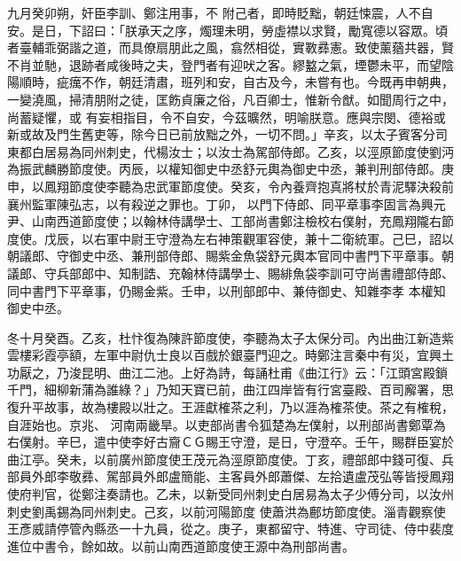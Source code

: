 \begin{pinyinscope}
 九月癸卯朔，奸臣李訓、鄭注用事，不
 附己者，即時貶黜，朝廷悚震，人不自安。是日，下詔曰：「朕承天之序，燭理未明，勞虛襟以求賢，勵寬德以容眾。頃者臺輔乖弼諧之道，而具僚扇朋此之風，翕然相從，實斁彞憲。致使薰蕕共器，賢不肖並馳，退跡者咸後時之夫，登門者有迎吠之客。繆盭之氣，堙鬱未平，而望陰陽順時，疵癘不作，朝廷清肅，班列和安，自古及今，未嘗有也。今既再申朝典，一變澆風，掃清朋附之徒，匡飭貞廉之俗，凡百卿士，惟新令猷。如聞周行之中，尚蓄疑懼，或
 有妄相指目，令不自安，今茲曠然，明喻朕意。應與宗閔、德裕或新或故及門生舊吏等，除今日已前放黜之外，一切不問。」辛亥，以太子賓客分司東都白居易為同州刺史，代楊汝士；以汝士為駕部侍郎。乙亥，以涇原節度使劉沔為振武麟勝節度使。丙辰，以權知御史中丞舒元輿為御史中丞，兼判刑部侍郎。庚申，以鳳翔節度使李聽為忠武軍節度使。癸亥，令內養齊抱真將杖於青泥驛決殺前襄州監軍陳弘志，以有殺逆之罪也。丁卯，
 以門下侍郎、同平章事李固言為興元尹、山南西道節度使；以翰林侍講學士、工部尚書鄭注檢校右僕射，充鳳翔隴右節度使。戊辰，以右軍中尉王守澄為左右神策觀軍容使，兼十二衛統軍。己巳，詔以朝議郎、守御史中丞、兼刑部侍郎、賜紫金魚袋舒元輿本官同中書門下平章事。朝議郎、守兵部郎中、知制誥、充翰林侍講學士、賜緋魚袋李訓可守尚書禮部侍郎、同中書門下平章事，仍賜金紫。壬申，以刑部郎中、兼侍御史、知雜李孝
 本權知御史中丞。



 冬十月癸酉。乙亥，杜忭復為陳許節度使，李聽為太子太保分司。內出曲江新造紫雲樓彩霞亭額，左軍中尉仇士良以百戲於銀臺門迎之。時鄭注言秦中有災，宜興土功厭之，乃浚昆明、曲江二池。上好為詩，每誦杜甫《曲江行》云：「江頭宮殿鎖千門，細柳新蒲為誰綠？」乃知天寶已前，曲江四岸皆有行宮臺殿、百司廨署，思復升平故事，故為樓殿以壯之。王涯獻榷茶之利，乃以涯為榷茶使。茶之有榷稅，自涯始也。京兆、
 河南兩畿旱。以吏部尚書令狐楚為左僕射，以刑部尚書鄭覃為右僕射。辛巳，遣中使李好古齎ＣＧ賜王守澄，是日，守澄卒。壬午，賜群臣宴於曲江亭。癸未，以前廣州節度使王茂元為涇原節度使。丁亥，禮部郎中錢可復、兵部員外郎李敬彞、駕部員外郎盧簡能、主客員外郎蕭傑、左拾遺盧茂弘等皆授鳳翔使府判官，從鄭注奏請也。乙未，以新受同州刺史白居易為太子少傅分司，以汝州刺史劉禹錫為同州刺史。己亥，以前河陽節度
 使蕭洪為鄜坊節度使。淄青觀察使王彥威請停管內縣丞一十九員，從之。庚子，東都留守、特進、守司徒、侍中裴度進位中書令，餘如故。以前山南西道節度使王源中為刑部尚書。




\end{pinyinscope}
